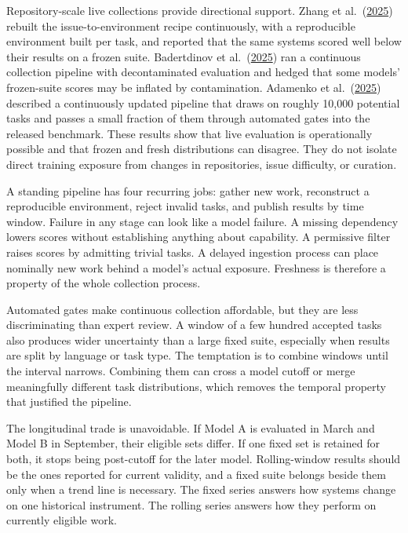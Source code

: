 Repository-scale live collections provide directional support. Zhang et al.~(\href{https://arxiv.org/abs/2505.23419}{2025}) rebuilt the issue-to-environment recipe continuously, with a reproducible environment built per task, and reported that the same systems scored well below their results on a frozen suite. Badertdinov et al.~(\href{https://arxiv.org/abs/2505.20411}{2025}) ran a continuous collection pipeline with decontaminated evaluation and hedged that some models' frozen-suite scores may be inflated by contamination. Adamenko et al.~(\href{https://arxiv.org/abs/2507.11059}{2025}) described a continuously updated pipeline that draws on roughly 10,000 potential tasks and passes a small fraction of them through automated gates into the released benchmark. These results show that live evaluation is operationally possible and that frozen and fresh distributions can disagree. They do not isolate direct training exposure from changes in repositories, issue difficulty, or curation.

A standing pipeline has four recurring jobs: gather new work, reconstruct a reproducible environment, reject invalid tasks, and publish results by time window. Failure in any stage can look like a model failure. A missing dependency lowers scores without establishing anything about capability. A permissive filter raises scores by admitting trivial tasks. A delayed ingestion process can place nominally new work behind a model's actual exposure. Freshness is therefore a property of the whole collection process.

Automated gates make continuous collection affordable, but they are less discriminating than expert review. A window of a few hundred accepted tasks also produces wider uncertainty than a large fixed suite, especially when results are split by language or task type. The temptation is to combine windows until the interval narrows. Combining them can cross a model cutoff or merge meaningfully different task distributions, which removes the temporal property that justified the pipeline.

The longitudinal trade is unavoidable. If Model A is evaluated in March and Model B in September, their eligible sets differ. If one fixed set is retained for both, it stops being post-cutoff for the later model. Rolling-window results should be the ones reported for current validity, and a fixed suite belongs beside them only when a trend line is necessary. The fixed series answers how systems change on one historical instrument. The rolling series answers how they perform on currently eligible work.

